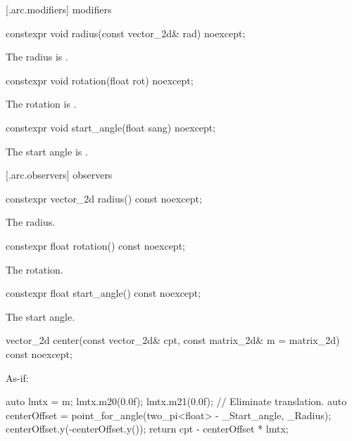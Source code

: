  [\iotwod.arc.modifiers]{ modifiers}

%
\begin{itemdecl}
constexpr void radius(const vector_2d& rad) noexcept;
\end{itemdecl}
\begin{itemdescr}
\pnum
\effects
The radius is .
\end{itemdescr}

%
\begin{itemdecl}
constexpr void rotation(float rot) noexcept;
\end{itemdecl}
\begin{itemdescr}
\pnum
\effects
The rotation is .
\end{itemdescr}

%
\begin{itemdecl}
constexpr void start_angle(float sang) noexcept;
\end{itemdecl}
\begin{itemdescr}
\pnum
\effects
The start angle is .
\end{itemdescr}

 [\iotwod.arc.observers]{ observers}

%
\begin{itemdecl}
constexpr vector_2d radius() const noexcept;
\end{itemdecl}
\begin{itemdescr}
\pnum
\returns
The radius.
\end{itemdescr}

%
\begin{itemdecl}
constexpr float rotation() const noexcept;
\end{itemdecl}
\begin{itemdescr}
\pnum
\returns
The rotation.
\end{itemdescr}

%
\begin{itemdecl}
constexpr float start_angle() const noexcept;
\end{itemdecl}
\begin{itemdescr}
\pnum
\returns
The start angle.
\end{itemdescr}

%
\begin{itemdecl}
vector_2d center(const vector_2d& cpt, const matrix_2d& m = matrix_2d{})
  const noexcept;
\end{itemdecl}
\begin{itemdescr}
\pnum
\returns
As-if:
\begin{codeblock}
auto lmtx = m;
lmtx.m20(0.0f); lmtx.m21(0.0f); // Eliminate translation.
auto centerOffset = point_for_angle(two_pi<float> - _Start_angle, _Radius);
centerOffset.y(-centerOffset.y());
return cpt - centerOffset * lmtx;
\end{codeblock}
\end{itemdescr}

